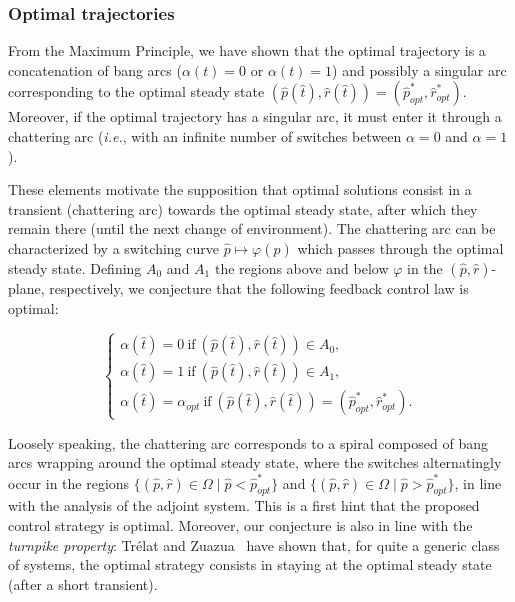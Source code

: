 \subsubsection{Optimal trajectories}

From the Maximum Principle, we have shown that the optimal trajectory is a concatenation of bang arcs ($\alpha(t)=0$ or $\alpha(t)=1$) and possibly a singular arc corresponding to the optimal steady state $(\hat{p}(\hat{t}),\hat{r}(\hat{t}))=(\hat{p}_{opt}^*,\hat{r}_{opt}^*)$. Moreover, if the optimal trajectory has a singular arc, it must enter it through a chattering arc (\textit{i.e.}, with an infinite number of switches between $\alpha=0$ and $\alpha=1$).

These elements motivate the supposition that optimal solutions consist in a transient (chattering arc) towards the optimal steady state, after which they remain there (until the next change of environment). The chattering arc can be characterized by a switching curve $\hat{p}\mapsto\varphi(\hat{p})$ which passes through the optimal steady state.
Defining $A_0$ and $A_1$ the regions above and below $\varphi$ in the $(\hat{p},\hat{r})$-plane, respectively, we conjecture that the following feedback control law is optimal: 


\begin{equation}\label{control-opt}
\begin{cases}
\alpha(\hat{t})=0 \ \textrm{if} \ (\hat{p}(\hat{t}),\hat{r}(\hat{t}))\in A_0,\\
\alpha(\hat{t})=1 \ \textrm{if} \ (\hat{p}(\hat{t}),\hat{r}(\hat{t}))\in A_1,\\
\alpha(\hat{t})=\alpha_{opt} \ \textrm{if} \ (\hat{p}(\hat{t}),\hat{r}(\hat{t}))=(\hat{p}_{opt}^*,\hat{r}_{opt}^*).
\end{cases}
\end{equation}


Loosely speaking, the chattering arc corresponds to a spiral composed of bang arcs wrapping around the optimal steady state, where the switches alternatingly occur in the regions  $\{(\hat{p},\hat{r})\in \Omega \mid \hat{p}<\hat{p}_{opt}^*\}$ and $\{(\hat{p},\hat{r})\in \Omega \mid \hat{p}>\hat{p}_{opt}^*\}$, in line with the analysis of the adjoint system.
This is a first hint that the proposed control strategy is optimal. Moreover, our conjecture is also in line with the \textit{turnpike property}:
Trélat and Zuazua~\cite{trelat_turnpike_2015} have shown that, for quite a generic class of systems, the optimal strategy consists in staying at the optimal steady state (after a short transient).

